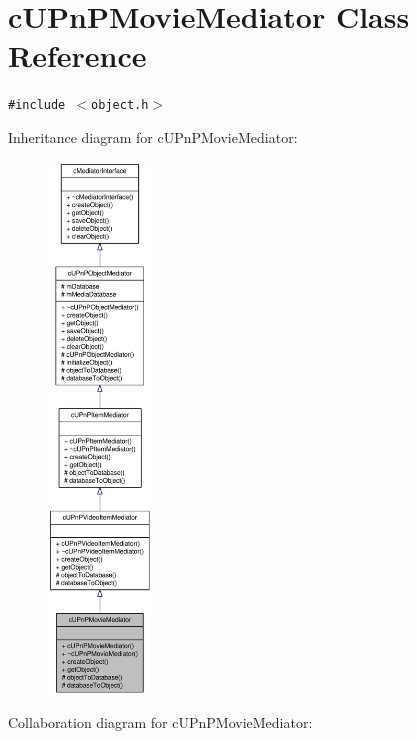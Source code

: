 \hypertarget{classcUPnPMovieMediator}{
\section{cUPnPMovieMediator Class Reference}
\label{classcUPnPMovieMediator}
}
{\tt \#include $<$object.h$>$}

Inheritance diagram for cUPnPMovieMediator:\nopagebreak
\begin{figure}[H]
\begin{center}
\leavevmode
\includegraphics[height=400pt]{classcUPnPMovieMediator__inherit__graph}
\end{center}
\end{figure}
Collaboration diagram for cUPnPMovieMediator:\nopagebreak

